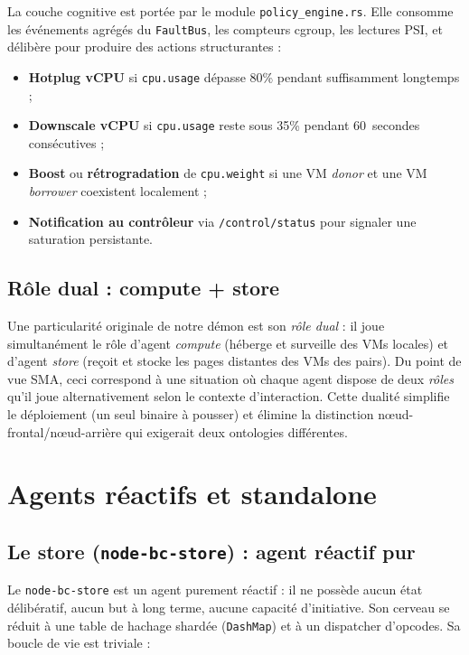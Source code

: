 La couche cognitive est portée par le module \texttt{policy\_engine.rs}. Elle consomme les événements agrégés du \texttt{FaultBus}, les compteurs cgroup, les lectures PSI, et délibère pour produire des actions structurantes :

\begin{itemize}[leftmargin=*]
    \item \textbf{Hotplug vCPU} si \texttt{cpu.usage} dépasse 80\% pendant suffisamment longtemps ;
    \item \textbf{Downscale vCPU} si \texttt{cpu.usage} reste sous 35\% pendant 60~secondes consécutives ;
    \item \textbf{Boost} ou \textbf{rétrogradation} de \texttt{cpu.weight} si une VM \emph{donor} et une VM \emph{borrower} coexistent localement ;
    \item \textbf{Notification au contrôleur} via \texttt{/control/status} pour signaler une saturation persistante.
\end{itemize}

\subsection{Rôle dual : compute + store}

Une particularité originale de notre démon est son \emph{rôle dual} : il joue simultanément le rôle d'agent \emph{compute} (héberge et surveille des VMs locales) et d'agent \emph{store} (reçoit et stocke les pages distantes des VMs des pairs). Du point de vue SMA, ceci correspond à une situation où chaque agent dispose de deux \emph{rôles} qu'il joue alternativement selon le contexte d'interaction. Cette dualité simplifie le déploiement (un seul binaire à pousser) et élimine la distinction nœud-frontal/nœud-arrière qui exigerait deux ontologies différentes.

\section{Agents réactifs et standalone}
\label{sec:sma-reactive}

\subsection{Le store (\texttt{node-bc-store}) : agent réactif pur}

Le \texttt{node-bc-store} est un agent purement réactif : il ne possède aucun état délibératif, aucun but à long terme, aucune capacité d'initiative. Son \og{}cerveau\fg{} se réduit à une table de hachage shardée (\texttt{DashMap}) et à un dispatcher d'opcodes. Sa boucle de vie est triviale :

